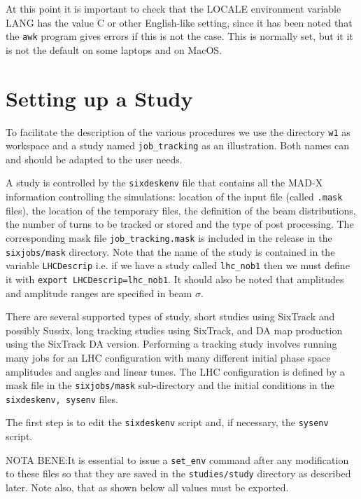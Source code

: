 \documentclass{cernatsnote}
\begin{document}
At this point it is important to check that the LOCALE environment variable
LANG has the value C or other English-like setting, since it has been noted
that the \texttt{awk} program gives errors if this is not the case. This is
normally set, but it it is not the default on some laptops and on MacOS.

\section{Setting up a Study}
\label{sec:study}

To facilitate the description of the various procedures we use the directory
\texttt{w1} as workspace and a study named \texttt{job\_tracking} as an illustration.
Both names can and should be adapted to the user needs.

A study is controlled by the \texttt{sixdeskenv} file that contains all the MAD-X
information controlling the simulations: location of the  input file
(called \texttt{.mask} files), the location of the temporary files, the definition
of the beam distributions, the number of turns to be tracked or stored and the
type of post processing. The corresponding mask file \texttt{job\_tracking.mask}
is included in the release in the \texttt{sixjobs/mask} directory. Note that the
name of the study is contained in the variable \texttt{LHCDescrip} i.e. if we have
a study called \texttt{lhc\_nob1} then we must define it with {\tt export
LHCDescrip=lhc\_nob1}. It should also be noted that amplitudes and amplitude
ranges are specified in beam $\sigma$.

There are several supported types of study, short studies using SixTrack and
possibly Sussix, long tracking studies using SixTrack, and DA map production
using the SixTrack DA version.  Performing a tracking study involves running
many jobs for an LHC configuration with many different initial phase space
amplitudes and angles and linear tunes. The LHC configuration is defined by a
mask file in the \texttt{sixjobs/mask} sub-directory and the initial conditions
in the \texttt{sixdeskenv, sysenv} files.

The first step is to edit the \texttt{sixdeskenv} script and, if necessary, the
\texttt{sysenv} script.

NOTA BENE:It is essential to issue a \texttt{set\_env} command after any
modification to these files so that they are saved in the \texttt{studies/study}
directory as described later.  Note also, that as shown below all values must
be exported.
\end{document}
